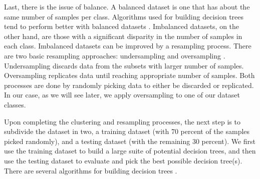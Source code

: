 Last, there is the issue of balance. A balanced dataset is one that has about the same number of samples per class. Algorithms used for building decision trees tend to perform better with balanced datasets \citep[e.g.,][]{Branco_2016_ACMCS, Weiss_2003_JAIR}. Imbalanced datasets, on the other hand, are those with a significant disparity in the number of samples in each class. Imbalanced datasets can be improved by a resampling process. There are two basic resampling approaches: undersampling and oversampling \citep{Branco_2016_ACMCS}. Undersampling discards data from the subsets with larger number of samples. Oversampling replicates data until reaching appropriate number of samples. Both processes are done by randomly picking data to either be discarded or replicated. In our case, as we will see later, we apply oversampling to one of our dataset classes. 


Upon completing the clustering and resampling processes, the next step is to subdivide the dataset in two, a training dataset (with 70 percent of the samples picked randomly), and a testing dataset (with the remaining 30 percent). We first use the training dataset to build a large suite of potential decision trees, and then use the testing dataset to evaluate and pick the best possible decision tree(s). There are several algorithms for building decision trees \citep[e.g., ID3, C4.5, C5.0, CART; see][]{Quinlan_1986_ML, Quinlan_1993_Book, Quinlan_1996_JAIR, Breiman_1984_Book}. 

